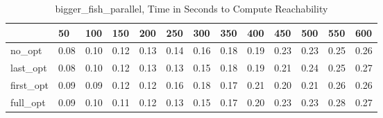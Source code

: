 \begin{table}
\caption{bigger\_fish\_parallel, Time in Seconds to Compute Reachability}
\label{bigger_fish_parallel_states_time}
\begin{tabular}{lllllllllllll}
\toprule
 & 50 & 100 & 150 & 200 & 250 & 300 & 350 & 400 & 450 & 500 & 550 & 600 \\
\midrule
no\_opt & 0.08 & 0.10 & 0.12 & 0.13 & 0.14 & 0.16 & 0.18 & 0.19 & 0.23 & 0.23 & 0.25 & 0.26 \\
last\_opt & 0.08 & 0.10 & 0.12 & 0.13 & 0.13 & 0.15 & 0.18 & 0.19 & 0.21 & 0.24 & 0.25 & 0.27 \\
first\_opt & 0.09 & 0.09 & 0.12 & 0.12 & 0.16 & 0.18 & 0.17 & 0.21 & 0.20 & 0.21 & 0.26 & 0.26 \\
full\_opt & 0.09 & 0.10 & 0.11 & 0.12 & 0.13 & 0.15 & 0.17 & 0.20 & 0.23 & 0.23 & 0.28 & 0.27 \\
\bottomrule
\end{tabular}
\end{table}
